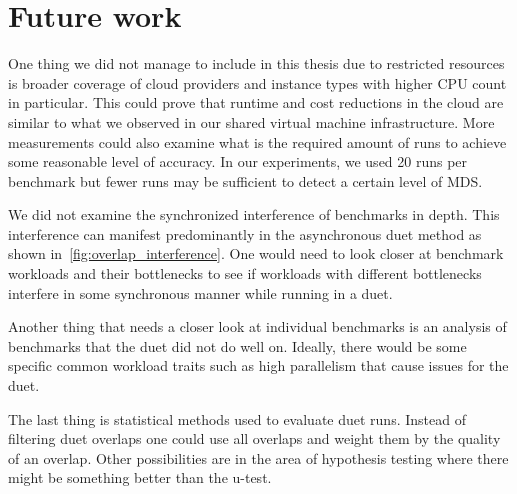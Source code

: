 \section{Future work}
One thing we did not manage to include in this thesis due to restricted resources is broader coverage of cloud providers and instance types with higher CPU count in particular.
This could prove that runtime and cost reductions in the cloud are similar to what we observed in our shared virtual machine infrastructure.
More measurements could also examine what is the required amount of runs to achieve some reasonable level of accuracy.
In our experiments, we used 20 runs per benchmark but fewer runs may be sufficient to detect a certain level of MDS.

We did not examine the synchronized interference of benchmarks in depth.
This interference can manifest predominantly in the asynchronous duet method as shown in~\cref{fig:overlap_interference}.
One would need to look closer at benchmark workloads and their bottlenecks to see if workloads with different bottlenecks interfere in some synchronous manner while running in a duet.

Another thing that needs a closer look at individual benchmarks is an analysis of benchmarks that the duet did not do well on.
Ideally, there would be some specific common workload traits such as high parallelism that cause issues for the duet.

The last thing is statistical methods used to evaluate duet runs.
Instead of filtering duet overlaps one could use all overlaps and weight them by the quality of an overlap.
Other possibilities are in the area of hypothesis testing where there might be something better than the \mbox{u-test}.
